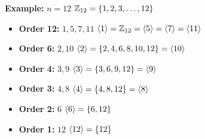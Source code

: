 \documentclass[openany]{report}
\begin{document}
\textbf{Example:} $n = 12$ $\mathbb{Z}_{12} = \{1,2,3,\dots,12\}$\\
\begin{itemize}
    \item \textbf{Order 12:} $1,5,7,11$ $\langle 1 \rangle = \mathbb{Z}_{12} = \langle 5 \rangle = \langle 7 \rangle = \langle 11 \rangle$
    \item \textbf{Order 6:} $2,10$ $\langle 2 \rangle = \{2,4,6,8,10,12\} = \langle 10 \rangle$
    \item \textbf{Order 4:} $3,9$ $\langle 3 \rangle = \{3,6,9,12\} = \langle 9 \rangle$
    \item \textbf{Order 3:} $4,8$ $\langle 4 \rangle = \{4,8,12\} = \langle 8 \rangle$
    \item \textbf{Order 2:} $6$ $\langle 6 \rangle = \{6,12\}$
    \item \textbf{Order 1:} $12$ $\langle 12 \rangle = \{12\}$
\end{itemize}
\end{document}
